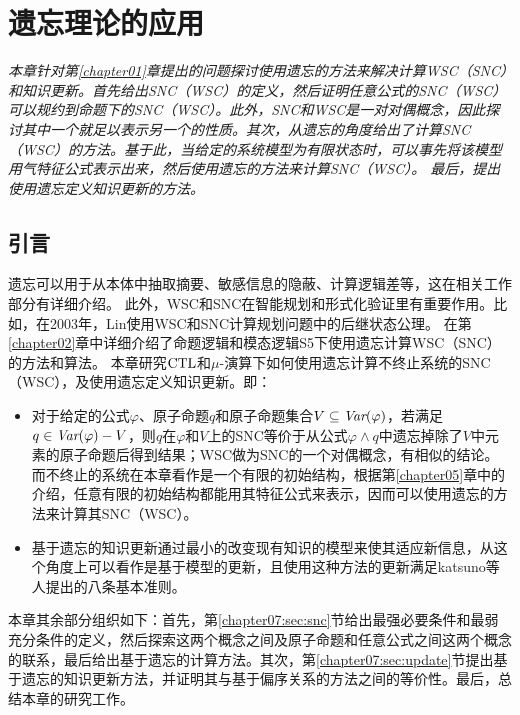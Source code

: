 \chapter{遗忘理论的应用}
\label{chapter07}
{\em 本章针对第\ref{chapter01}章提出的问题探讨使用遗忘的方法来解决计算WSC（SNC）和知识更新。首先给出SNC（WSC）的定义，然后证明任意公式的SNC（WSC）可以规约到命题下的SNC（WSC）。此外，SNC和WSC是一对对偶概念，因此探讨其中一个就足以表示另一个的性质。其次，从遗忘的角度给出了计算SNC（WSC）的方法。基于此，当给定的系统模型为有限状态时，可以事先将该模型用气特征公式表示出来，然后使用遗忘的方法来计算SNC（WSC）。
最后，提出使用遗忘定义知识更新的方法。
	}
\section{引言}
遗忘可以用于从本体中抽取摘要、敏感信息的隐蔽、计算逻辑差等，这在相关工作部分有详细介绍。
此外，WSC和SNC在智能规划和形式化验证里有重要作用。比如，在2003年，Lin使用WSC和SNC计算规划问题中的后继状态公理。
在第\ref{chapter02}章中详细介绍了命题逻辑和模态逻辑S5下使用遗忘计算WSC（SNC）的方法和算法。
本章研究$\textrm{CTL}$和$\mu$-演算下如何使用遗忘计算不终止系统的SNC（WSC），及使用遗忘定义知识更新。即：
\begin{itemize}
	\item 对于给定的公式$\varphi$、原子命题$q$和原子命题集合$V\subseteq \textit{Var}(\varphi)$，若满足$q \in \textit{Var}(\varphi)-V$，则$q$在$\varphi$和$V$上的SNC等价于从公式$\varphi \wedge q$中遗忘掉除了$V$中元素的原子命题后得到结果；WSC做为SNC的一个对偶概念，有相似的结论。而不终止的系统在本章看作是一个有限的初始结构，根据第\ref{chapter05}章中的介绍，任意有限的初始结构都能用其特征公式来表示，因而可以使用遗忘的方法来计算其SNC（WSC）。
	\item 基于遗忘的知识更新通过最小的改变现有知识的模型来使其适应新信息，从这个角度上可以看作是基于模型的更新，且使用这种方法的更新满足katsuno等人提出的八条基本准则\cite{katsuno91mendelzon}。
\end{itemize}


本章其余部分组织如下：首先，第\ref{chapter07:sec:snc}节给出最强必要条件和最弱充分条件的定义，然后探索这两个概念之间及原子命题和任意公式之间这两个概念的联系，最后给出基于遗忘的计算方法。其次，第\ref{chapter07:sec:update}节提出基于遗忘的知识更新方法，并证明其与基于偏序关系的方法之间的等价性。最后，总结本章的研究工作。

